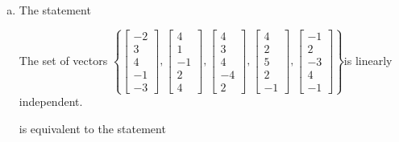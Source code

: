 \begin{exerciseAnswer}
\begin{enumerate}[(a)]
\item The statement 
\begin{center}\begin{minipage}{0.8\textwidth}
 The set of vectors \( \left\{ \left[\begin{array}{c}
-2 \\
3 \\
4 \\
-1 \\
-3
\end{array}\right] , \left[\begin{array}{c}
4 \\
1 \\
-1 \\
2 \\
4
\end{array}\right] , \left[\begin{array}{c}
4 \\
3 \\
4 \\
-4 \\
2
\end{array}\right] , \left[\begin{array}{c}
4 \\
2 \\
5 \\
2 \\
-1
\end{array}\right] , \left[\begin{array}{c}
-1 \\
2 \\
-3 \\
4 \\
-1
\end{array}\right] \right\} \)is linearly independent.
\end{minipage}\end{center}
     is equivalent to the statement 
\begin{center}\begin{minipage}{0.8\textwidth}
 The vector equation \( x_{1} \left[\begin{array}{c}
-2 \\
3 \\
4 \\
-1 \\
-3
\end{array}\right] + x_{2} \left[\begin{array}{c}
4 \\
1 \\

\end{array}
\end{minipage}
\end{center}
\end{enumerate}
\end{exerciseAnswer}

